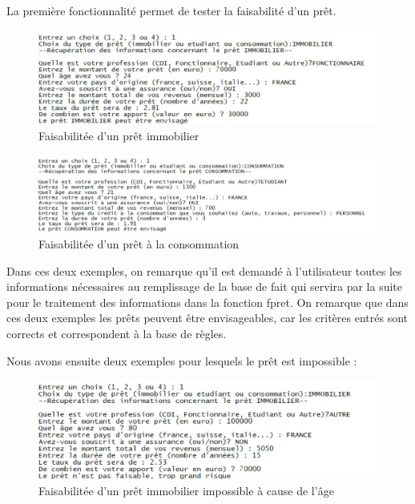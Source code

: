 \documentclass[
]{article}
\begin{document}
La première fonctionnalité permet de tester la faisabilité d'un prêt.

\begin{figure}[H]
\centering
\includegraphics{img/fpret_possible_immo.jpg}
\caption{Faisabilitée d'un prêt immobilier}
\end{figure}

\begin{figure}[H]
\centering
\includegraphics{img/fpret_possible_conso.jpg}
\caption{Faisabilitée d'un prêt à la consommation}
\end{figure}

Dans ces deux exemples, on remarque qu'il est demandé à l'utilisateur
toutes les informations nécessaires au remplissage de la base de fait
qui servira par la suite pour le traitement des informations dans la
fonction fpret. On remarque que dans ces deux exemples les prêts peuvent
être envisageables, car les critères entrés sont corrects et
correspondent à la base de règles.

\pagebreak

Nous avons ensuite deux exemples pour lesquels le prêt est impossible :

\begin{figure}[H]
\centering
\includegraphics{img/fpret_impossible_age.jpg}
\caption{Faisabilitée d'un prêt immobilier impossible à cause de l'âge}
\end{figure}
\end{document}
